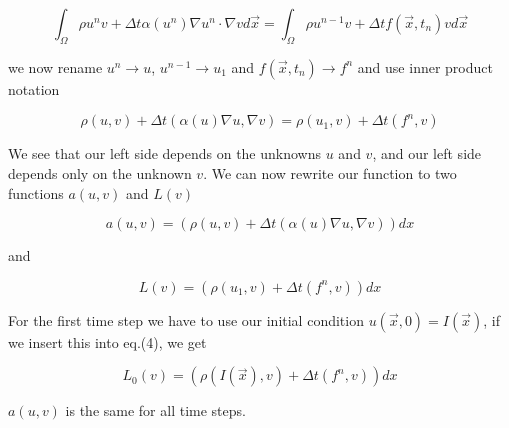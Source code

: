 \begin{equation*}
 \int_{\Omega} \rho u^{n}v + \Delta t \alpha(u^{n}) \nabla u^{n} \cdotp \nabla v d\vec{x} = \int_{\Omega} \rho u^{n-1}v  + \Delta t f(\vec{x},t_{n})v d\vec{x}
\end{equation*}

we now rename $u^{n} \rightarrow u$, $u^{n-1} \rightarrow u_1$ and $f(\vec{x},t_{n}) \rightarrow f^n$ and use inner product notation

\begin{equation*}
 \rho(u,v) + \Delta t (\alpha(u) \nabla u,\nabla v) = \rho(u_1,v)  + \Delta t(f^n,v)
\end{equation*}

We see that our left side depends on the unknowns $u$ and $v$, and our left side depends only on the unknown $v$. We can now rewrite our function to two functions $a(u,v)$ and $L(v)$

\begin{equation}
 a(u,v) = (\rho(u,v) + \Delta t (\alpha(u) \nabla u,\nabla v))dx
\end{equation}

and 

\begin{equation}
 L(v) = (\rho(u_1,v)  + \Delta t(f^n,v))dx
\end{equation}

For the first time step we have to use our initial condition $u(\vec{x},0) = I(\vec{x})$, if we insert this into eq.(4), we get

\begin{equation}
 L_0(v) = (\rho(I(\vec{x}),v)  + \Delta t(f^n,v))dx
\end{equation}

$a(u,v)$ is the same for all time steps.